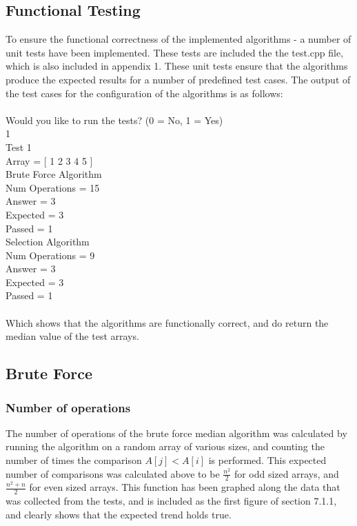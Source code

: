 \documentclass{article}
\newcommand\tab[1][1cm]{\hspace*{#1}}
\begin{document}
    \subsection{Functional Testing}
        To ensure the functional correctness of the implemented algorithms - a number of unit tests have been implemented. These tests are included the the test.cpp file, which is also included in appendix 1. These unit tests ensure that the algorithms produce the expected results for a number of predefined test cases. The output of the test cases for the configuration of the algorithms is as follows:\\\\
        Would you like to run the tests? (0 = No, 1 = Yes)\\
        1\\
        Test 1\\
           \tab Array = [ 1 2 3 4 5 ]\\
               \tab \tab Brute Force Algorithm\\
                   \tab \tab \tab Num Operations = 15\\
                   \tab \tab \tab Answer = 3\\
                   \tab \tab \tab Expected = 3\\
                   \tab \tab \tab Passed = 1\\
               \tab \tab Selection Algorithm\\
                   \tab \tab \tab Num Operations = 9\\
                   \tab \tab \tab Answer = 3\\
                   \tab \tab \tab Expected = 3\\
                   \tab \tab \tab Passed = 1\\\\
        Which shows that the algorithms are functionally correct, and do return the median value of the test arrays.
    \subsection{Brute Force}
        \subsubsection{Number of operations}
            The number of operations of the brute force median algorithm was calculated by running the algorithm on a random array of various sizes, and counting the number of times the comparison $A[j] < A[i]$ is performed. This expected number of comparisons was calculated above to be $\frac{n^2}{2}$ for odd sized arrays, and $\frac{n^2 + n}{2}$ for even sized arrays. This function has been graphed along the data that was collected from the tests, and is included as the first figure of section 7.1.1, and clearly shows that the expected trend holds true.
\end{document}
